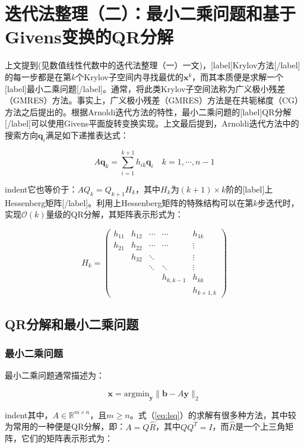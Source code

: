 \documentclass[UTF8,nofonts]{ctexart}
\begin{document}

\section*{迭代法整理（二）：最小二乘问题和基于Givens变换的QR分解}

上文提到(见数值线性代数中的迭代法整理（一）一文)，[label]Krylov方法[/label]的每一步都是在第$k$个Krylov子空间内寻找最优的$\boldsymbol{x}^k$，而其本质便是求解一个[label]最小二乘问题[/label]。通常，将此类Krylov子空间法称为广义极小残差（GMRES）方法。事实上，广义极小残差（GMRES）方法是在共轭梯度（CG）方法之后提出的。根据Arnoldi迭代方法的特性，最小二乘问题的[label]QR分解[/label]可以使用Givens平面旋转变换实现。上文最后提到，Arnoldi迭代方法中的搜索方向$\boldsymbol{q}_i$满足如下递推表达式：

\[
A\boldsymbol{q}_k=\sum_{i=1}^{k+1}h_{ik}\boldsymbol{q}_i\quad k=1,\cdots,n-1
\]

indent它也等价于：$AQ_k=Q_{k+1}H_k$，其中$H_k$为$(k+1) \times k$阶的[label]上Hessenberg矩阵[/label]。利用上Hessenberg矩阵的特殊结构可以在第$k$步迭代时，实现$\mathcal{O}(k)$量级的QR分解，其矩阵表示形式为：

\[
H_k=
\begin{pmatrix}
h_{11} & h_{12} & \cdots & \cdots & h_{1k} \\
h_{21} & h_{22} & \cdots & \cdots & \vdots \\
& h_{32} & \ddots & & \vdots \\
& & \ddots & \ddots & \vdots \\
& & & h_{k,k-1} & h_{kk} \\
& & & & h_{k+1,k}
\end{pmatrix}
\]

\subsection*{QR分解和最小二乘问题}

\subsubsection*{最小二乘问题}

最小二乘问题通常描述为：

\begin{equation}
\label{eq:lsq}
\boldsymbol{x}=\text{argmin}_{\boldsymbol{y}}\|\boldsymbol{b}-A\boldsymbol{y}\|_2
\end{equation}

indent其中，$A\in\mathbb{R}^{m \times n}$，且$m \geq n$。式（\ref{eq:lsq}）的求解有很多种方法，其中较为常用的一种便是QR分解，即：$A=Q\hat{R}$，其中$QQ^T=I$，而$\hat{R}$是一个上三角矩阵，它们的矩阵表示形式为：
\end{document}
